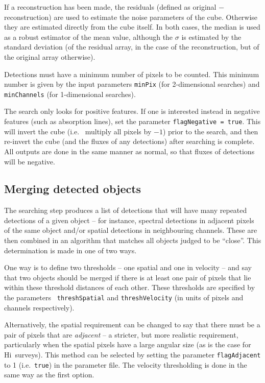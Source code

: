 \documentclass[12pt,a4paper]{article}
\newcommand{\ie}{i.e.\ }
\newcommand{\hi}{H{\sc i}}
\begin{document}
If a reconstruction has been made, the residuals (defined as original
$-$ reconstruction) are used to estimate the noise parameters of the
cube. Otherwise they are estimated directly from the cube itself. In
both cases, the median is used as a robust estimator of the mean
value, although the $\sigma$ is estimated by the standard deviation
(of the residual array, in the case of the reconstruction, but of the
original array otherwise).

Detections must have a minimum number of pixels to be counted. This
minimum number is given by the input parameters {\tt minPix} (for
2-dimensional searches) and {\tt minChannels} (for 1-dimensional
searches).

The search only looks for positive features. If one is interested
instead in negative features (such as absorption lines), set the
parameter {\tt flagNegative = true}. This will invert the cube (\ie
multiply all pixels by $-1$) prior to the search, and then re-invert
the cube (and the fluxes of any detections) after searching is
complete. All outputs are done in the same manner as normal, so that
fluxes of detections will be negative.

\subsection{Merging detected objects}
\label{sec-merger}

The searching step produces a list of detections that will have many
repeated detections of a given object -- for instance, spectral
detections in adjacent pixels of the same object and/or spatial
detections in neighbouring channels. These are then combined in an
algorithm that matches all objects judged to be ``close''. This
determination is made in one of two ways.

One way is to define two thresholds -- one spatial and one in velocity
-- and say that two objects should be merged if there is at least one
pair of pixels that lie within these threshold distances of each
other. These thresholds are specified by the parameters {\tt
threshSpatial} and {\tt threshVelocity} (in units of pixels and
channels respectively).

Alternatively, the spatial requirement can be changed to say that
there must be a pair of pixels that are {\it adjacent} -- a stricter,
but more realistic requirement, particularly when the spatial pixels
have a large angular size (as is the case for \hi\ surveys). This
method can be selected by setting the parameter
{\tt flagAdjacent} to 1 (\ie {\tt true}) in the parameter file. The
velocity thresholding is done in the same way as the first option.
\end{document}
